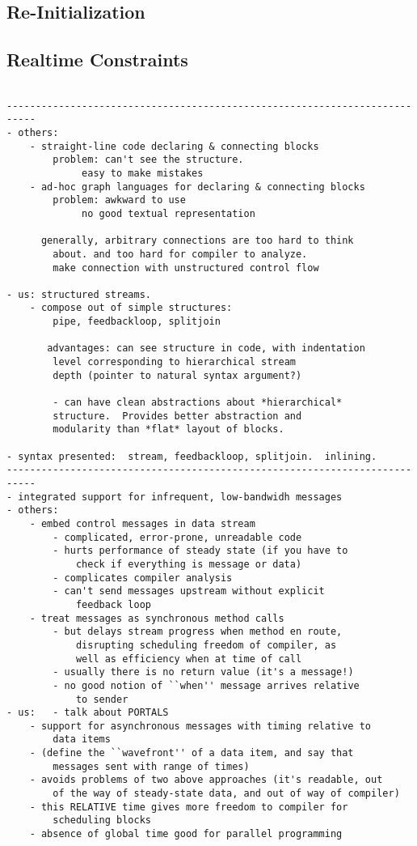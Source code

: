 \subsection{Re-Initialization}

\subsection{Realtime Constraints}

\begin{verbatim}

---------------------------------------------------------------------------
- others:
	- straight-line code declaring & connecting blocks
		problem: can't see the structure.
			 easy to make mistakes
	- ad-hoc graph languages for declaring & connecting blocks
		problem: awkward to use
			 no good textual representation

	  generally, arbitrary connections are too hard to think
		about. and too hard for compiler to analyze.
		make connection with unstructured control flow

- us: structured streams.
	- compose out of simple structures:  
		pipe, feedbackloop, splitjoin

	   advantages: can see structure in code, with indentation
		level corresponding to hierarchical stream
		depth (pointer to natural syntax argument?)

		- can have clean abstractions about *hierarchical*
		structure.  Provides better abstraction and
		modularity than *flat* layout of blocks.

- syntax presented:  stream, feedbackloop, splitjoin.  inlining.
---------------------------------------------------------------------------
- integrated support for infrequent, low-bandwidh messages
- others:
	- embed control messages in data stream
		- complicated, error-prone, unreadable code
		- hurts performance of steady state (if you have to 
			check if everything is message or data)
		- complicates compiler analysis
		- can't send messages upstream without explicit
			feedback loop
	- treat messages as synchronous method calls
		- but delays stream progress when method en route, 
			disrupting scheduling freedom of compiler, as
			well as efficiency when at time of call
		- usually there is no return value (it's a message!)
		- no good notion of ``when'' message arrives relative
			to sender
- us: 	- talk about PORTALS
	- support for asynchronous messages with timing relative to
		data items
	- (define the ``wavefront'' of a data item, and say that
		messages sent with range of times)
	- avoids problems of two above approaches (it's readable, out
		of the way of steady-state data, and out of way of compiler)
	- this RELATIVE time gives more freedom to compiler for
		scheduling blocks
	- absence of global time good for parallel programming


\end{verbatim}
